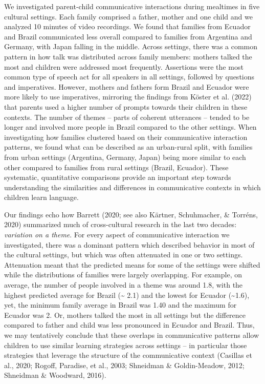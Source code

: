 \documentclass[
  man,floatsintext]{apa6}
\begin{document}
We investigated parent-child communicative interactions during mealtimes in five cultural settings. Each family comprised a father, mother and one child and we analyzed 10 minutes of video recordings. We found that families from Ecuador and Brazil communicated less overall compared to families from Argentina and Germany, with Japan falling in the middle. Across settings, there was a common pattern in how talk was distributed across family members: mothers talked the most and children were addressed most frequently. Assertions were the most common type of speech act for all speakers in all settings, followed by questions and imperatives. However, mothers and fathers form Brazil and Ecuador were more likely to use imperatives, mirroring the findings from Köster et al. (2022) that parents used a higher number of prompts towards their children in these contexts. The number of themes -- parts of coherent utterances -- tended to be longer and involved more people in Brazil compared to the other settings. When investigating how families clustered based on their communicative interaction patterns, we found what can be described as an urban-rural split, with families from urban settings (Argentina, Germany, Japan) being more similar to each other compared to families from rural settings (Brazil, Ecuador). These systematic, quantitative comparisons provide an important step towards understanding the similarities and differences in communicative contexts in which children learn language.

Our findings echo how Barrett (2020; see also Kärtner, Schuhmacher, \& Torréns, 2020) summarized much of cross-cultural research in the last two decades: \emph{variation on a theme}. For every aspect of communicative interaction we investigated, there was a dominant pattern which described behavior in most of the cultural settings, but which was often attenuated in one or two settings. Attenuation meant that the predicted means for some of the settings were shifted while the distributions of families were largely overlapping. For example, on average, the number of people involved in a theme was around 1.8, with the highest predicted average for Brazil (\textasciitilde{} 2.1) and the lowest for Ecuador (\textasciitilde1.6), yet, the minimum family average in Brazil was 1.40 and the maximum for Ecuador was 2. Or, mothers talked the most in all settings but the difference compared to father and child was less pronounced in Ecuador and Brazil. Thus, we may tentatively conclude that these overlaps in communicative patterns allow children to use similar learning strategies across settings -- in particular those strategies that leverage the structure of the communicative context (Casillas et al., 2020; Rogoff, Paradise, et al., 2003; Shneidman \& Goldin-Meadow, 2012; Shneidman \& Woodward, 2016).
\end{document}
